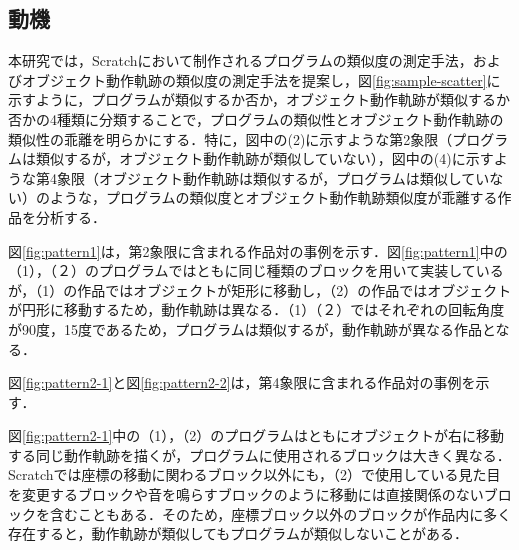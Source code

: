 \documentclass[T,J]{fose} %
\begin{document}


\subsection{動機}\label{subsec:reason}

本研究では，Scratchにおいて制作されるプログラムの類似度の測定手法，およびオブジェクト動作軌跡の類似度の測定手法を提案し，図\ref{fig:sample-scatter}に示すように，プログラムが類似するか否か，オブジェクト動作軌跡が類似するか否かの4種類に分類することで，プログラムの類似性とオブジェクト動作軌跡の類似性の乖離を明らかにする．特に，図中の(2)に示すような第2象限（プログラムは類似するが，オブジェクト動作軌跡が類似していない），図中の(4)に示すような第4象限（オブジェクト動作軌跡は類似するが，プログラムは類似していない）のような，プログラムの類似度とオブジェクト動作軌跡類似度が乖離する作品を分析する．

図\ref{fig:pattern1}は，第2象限に含まれる作品対の事例を示す．図\ref{fig:pattern1}中の（1），（２）のプログラムではともに同じ種類のブロックを用いて実装しているが，（1）の作品ではオブジェクトが矩形に移動し，（2）の作品ではオブジェクトが円形に移動するため，動作軌跡は異なる．（1）（２）ではそれぞれの回転角度が90度，15度であるため，プログラムは類似するが，動作軌跡が異なる作品となる．

図\ref{fig:pattern2-1}と図\ref{fig:pattern2-2}は，第4象限に含まれる作品対の事例を示す．

図\ref{fig:pattern2-1}中の（1），（2）のプログラムはともにオブジェクトが右に移動する同じ動作軌跡を描くが，プログラムに使用されるブロックは大きく異なる．Scratchでは座標の移動に関わるブロック以外にも，（2）で使用している見た目を変更するブロックや音を鳴らすブロックのように移動には直接関係のないブロックを含むこともある．そのため，座標ブロック以外のブロックが作品内に多く存在すると，動作軌跡が類似してもプログラムが類似しないことがある．
\end{document}
